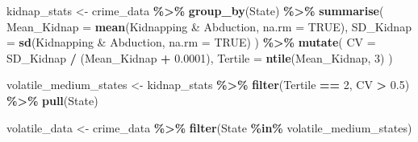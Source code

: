 \documentclass[
]{article}
\newenvironment{Shaded}{\begin{snugshade}}{\end{snugshade}}
\newcommand{\AttributeTok}[1]{\textcolor[rgb]{0.13,0.29,0.53}{#1}}
\newcommand{\ConstantTok}[1]{\textcolor[rgb]{0.56,0.35,0.01}{#1}}
\newcommand{\DecValTok}[1]{\textcolor[rgb]{0.00,0.00,0.81}{#1}}
\newcommand{\FloatTok}[1]{\textcolor[rgb]{0.00,0.00,0.81}{#1}}
\newcommand{\FunctionTok}[1]{\textcolor[rgb]{0.13,0.29,0.53}{\textbf{#1}}}
\newcommand{\NormalTok}[1]{#1}
\newcommand{\OtherTok}[1]{\textcolor[rgb]{0.56,0.35,0.01}{#1}}
\newcommand{\SpecialCharTok}[1]{\textcolor[rgb]{0.81,0.36,0.00}{\textbf{#1}}}
\newcommand{\StringTok}[1]{\textcolor[rgb]{0.31,0.60,0.02}{#1}}
\begin{document}
\begin{Shaded}
\begin{Highlighting}[]
\NormalTok{kidnap\_stats }\OtherTok{\textless{}{-}}\NormalTok{ crime\_data }\SpecialCharTok{\%\textgreater{}\%}
  \FunctionTok{group\_by}\NormalTok{(State) }\SpecialCharTok{\%\textgreater{}\%}
  \FunctionTok{summarise}\NormalTok{(}
    \AttributeTok{Mean\_Kidnap =} \FunctionTok{mean}\NormalTok{(}\StringTok{\textasciigrave{}}\AttributeTok{Kidnapping \& Abduction}\StringTok{\textasciigrave{}}\NormalTok{, }\AttributeTok{na.rm =} \ConstantTok{TRUE}\NormalTok{),}
    \AttributeTok{SD\_Kidnap =} \FunctionTok{sd}\NormalTok{(}\StringTok{\textasciigrave{}}\AttributeTok{Kidnapping \& Abduction}\StringTok{\textasciigrave{}}\NormalTok{, }\AttributeTok{na.rm =} \ConstantTok{TRUE}\NormalTok{)}
\NormalTok{  ) }\SpecialCharTok{\%\textgreater{}\%}
  \FunctionTok{mutate}\NormalTok{(}
    \AttributeTok{CV =}\NormalTok{ SD\_Kidnap }\SpecialCharTok{/}\NormalTok{ (Mean\_Kidnap }\SpecialCharTok{+} \FloatTok{0.0001}\NormalTok{),}
    \AttributeTok{Tertile =} \FunctionTok{ntile}\NormalTok{(Mean\_Kidnap, }\DecValTok{3}\NormalTok{) }
\NormalTok{  )}

\NormalTok{volatile\_medium\_states }\OtherTok{\textless{}{-}}\NormalTok{ kidnap\_stats }\SpecialCharTok{\%\textgreater{}\%}
  \FunctionTok{filter}\NormalTok{(Tertile }\SpecialCharTok{==} \DecValTok{2}\NormalTok{, CV }\SpecialCharTok{\textgreater{}} \FloatTok{0.5}\NormalTok{) }\SpecialCharTok{\%\textgreater{}\%}
  \FunctionTok{pull}\NormalTok{(State)}

\NormalTok{volatile\_data }\OtherTok{\textless{}{-}}\NormalTok{ crime\_data }\SpecialCharTok{\%\textgreater{}\%}
  \FunctionTok{filter}\NormalTok{(State }\SpecialCharTok{\%in\%}\NormalTok{ volatile\_medium\_states)}


\end{Highlighting}
\end{Shaded}
\end{document}
